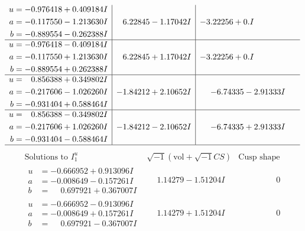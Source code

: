 \documentclass[1p]{elsarticle_modified}
\theoremstyle{definition}
\newcommand{\I}{\sqrt{-1}}
\begin{document}
$$\begin{array}{c|c|c}
\begin{aligned}
u &= -0.976418 + 0.409184 I \\
a &= -0.117550 - 1.213630 I \\
b &= -0.889554 - 0.262388 I\end{aligned}
 & \phantom{-}6.22845 - 1.17042 I & -3.22256 + 0. I\phantom{ +0.000000I} \\ \hline\begin{aligned}
u &= -0.976418 - 0.409184 I \\
a &= -0.117550 + 1.213630 I \\
b &= -0.889554 + 0.262388 I\end{aligned}
 & \phantom{-}6.22845 + 1.17042 I & -3.22256 + 0. I\phantom{ +0.000000I} \\ \hline\begin{aligned}
u &= \phantom{-}0.856388 + 0.349802 I \\
a &= -0.217606 - 1.026260 I \\
b &= -0.931404 + 0.588464 I\end{aligned}
 & -1.84212 + 2.10652 I & -6.74335 - 2.91333 I \\ \hline\begin{aligned}
u &= \phantom{-}0.856388 - 0.349802 I \\
a &= -0.217606 + 1.026260 I \\
b &= -0.931404 - 0.588464 I\end{aligned}
 & -1.84212 - 2.10652 I & -6.74335 + 2.91333 I\\
 \hline 
 \end{array}$$\newpage$$\begin{array}{c|c|c}  
\text{Solutions to }I^u_{1}& \I (\text{vol} + \sqrt{-1}CS) & \text{Cusp shape}\\
 \hline 
\begin{aligned}
u &= -0.666952 + 0.913096 I \\
a &= -0.008649 - 0.157261 I \\
b &= \phantom{-}0.697921 + 0.367007 I\end{aligned}
 & \phantom{-}1.14279 - 1.51204 I & \phantom{-0.000000 } 0 \\ \hline\begin{aligned}
u &= -0.666952 - 0.913096 I \\
a &= -0.008649 + 0.157261 I \\
b &= \phantom{-}0.697921 - 0.367007 I\end{aligned}
 & \phantom{-}1.14279 + 1.51204 I & \phantom{-0.000000 } 0 \\ \hline\begin{aligned}

\end{aligned}
\end{array}$$
\end{document}
